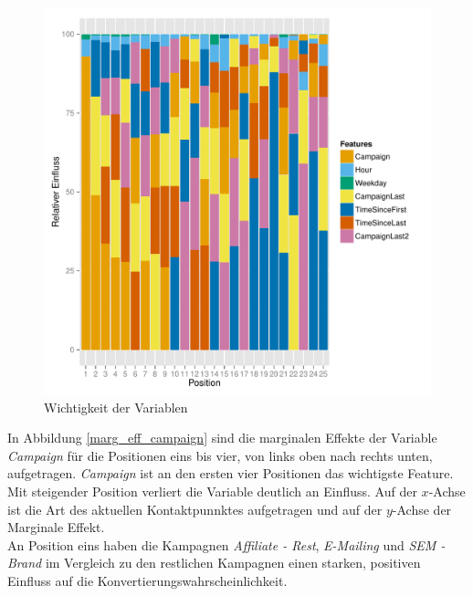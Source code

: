 \begin{figure}[H]
	\centering\includegraphics[scale=0.9]{variableImportance.pdf}\caption{Wichtigkeit der Variablen}\label{variable_importance}
\end{figure}
In Abbildung \ref{marg_eff_campaign} sind die marginalen Effekte der Variable \textit{Campaign} für die Positionen eins bis vier, von links oben nach rechts unten, aufgetragen. \textit{Campaign} ist an den ersten vier Positionen das wichtigste Feature. Mit steigender Position verliert die Variable deutlich an Einfluss. Auf der $x$-Achse ist die Art des aktuellen Kontaktpunnktes aufgetragen und auf der $y$-Achse der Marginale Effekt.\\
An Position eins haben die Kampagnen \textit{Affiliate - Rest}, \textit{E-Mailing} und \textit{SEM - Brand} im Vergleich zu den restlichen Kampagnen einen starken, positiven Einfluss auf die Konvertierungswahrscheinlichkeit.
